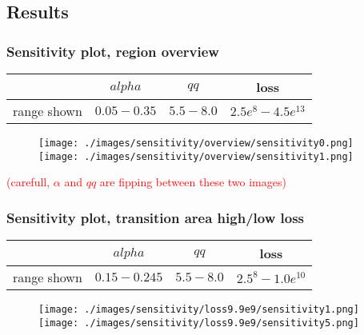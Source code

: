 \documentclass{beamer}
\begin{document}
\subsection{Results}
\begin{frame}
	\frametitle{Sensitivity plot, region overview}
	\begin{center}
		\begin{tabular}{|c|c|c|c|}
			\hline & $alpha$ & $qq$ & loss \\
			\hline range shown & $0.05-0.35$ & $5.5-8.0$ & $2.5e^{8}-4.5e^{13}$\\
			\hline
		\end{tabular}
		\begin{figure}
				\hspace{-1.3cm}
				\texttt{[image: ./images/sensitivity/overview/sensitivity0.png]}\hspace{-1.0cm}%
				\texttt{[image: ./images/sensitivity/overview/sensitivity1.png]}
		\end{figure}
		\textcolor{red}{(carefull, $\alpha$ and $qq$ are fipping between these two images)}
	\end{center}
\end{frame}

\begin{frame}
	\frametitle{Sensitivity plot, transition area high/low loss}
	\begin{center}
		\begin{tabular}{|c|c|c|c|}
			\hline & $alpha$ & $qq$ & loss \\
			\hline range shown & $0.15-0.245$ & $5.5-8.0$ & $2.5^{8}-1.0e^{10}$\\
			\hline
		\end{tabular}

		\begin{figure}[htbp]
				\hspace{-1.4cm}
				\texttt{[image: ./images/sensitivity/loss9.9e9/sensitivity1.png]}\hspace{-1.0cm} %
				\texttt{[image: ./images/sensitivity/loss9.9e9/sensitivity5.png]}
		\end{figure}
	\end{center}
\end{frame}
\end{document}
